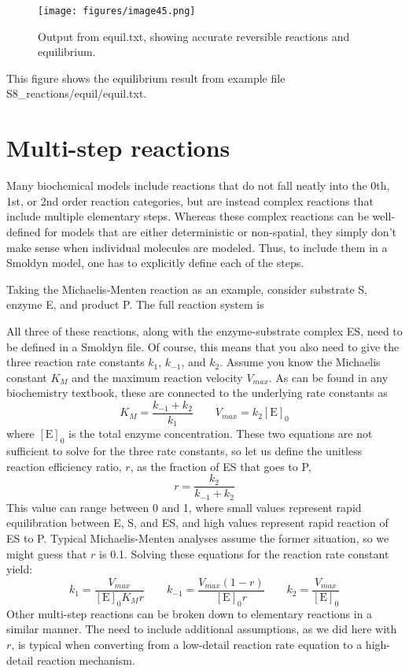 \documentclass {scrbook}
\begin{document}
\begin{figure}[h]
\centering
\texttt{[image: figures/image45.png]}
\caption{Output from equil.txt, showing accurate reversible reactions and equilibrium.}
\label{fig:equil}
\end{figure}

This figure shows the equilibrium result from example file S8\_reactions/equil/equil.txt.

\section{Multi-step reactions}

Many biochemical models include reactions that do not fall neatly into the 0th, 1st, or 2nd order reaction categories, but are instead complex reactions that include multiple elementary steps. Whereas these complex reactions can be well-defined for models that are either deterministic or non-spatial, they simply don't make sense when individual molecules are modeled. Thus, to include them in a Smoldyn model, one has to explicitly define each of the steps.

Taking the Michaelis-Menten reaction as an example, consider substrate S, enzyme E, and product P. The full reaction system is

All three of these reactions, along with the enzyme-substrate complex ES, need to be defined in a Smoldyn file. Of course, this means that you also need to give the three reaction rate constants $k_1$, $k_{-1}$, and $k_2$. Assume you know the Michaelis constant $K_M$ and the maximum reaction velocity $V_{max}$. As can be found in any biochemistry textbook, these are connected to the underlying rate constants as
$$K_M = \frac{k_{-1} + k_2}{k_1} \qquad V_{max} = k_2 [\textrm{E}]_0$$
where $[\textrm{E}]_0$ is the total enzyme concentration. These two equations are not sufficient to solve for the three rate constants, so let us define the unitless reaction efficiency ratio, $r$, as the fraction of ES that goes to P,
$$r=\frac{k_2}{k_{-1}+k_2}$$
This value can range between 0 and 1, where small values represent rapid equilibration between E, S, and ES, and high values represent rapid reaction of ES to P. Typical Michaelis-Menten analyses assume the former situation, so we might guess that $r$ is 0.1. Solving these equations for the reaction rate constant yield:
$$k_1 = \frac{V_{max}}{[\textrm{E}]_0 K_M r} \qquad k_{-1} = \frac{V_{max} (1-r)}{[\textrm{E}]_0 r} \qquad k_2 = \frac{V_{max}}{[\textrm{E}]_0}$$
Other multi-step reactions can be broken down to elementary reactions in a similar manner. The need to include additional assumptions, as we did here with $r$, is typical when converting from a low-detail reaction rate equation to a high-detail reaction mechanism.
\end{document}

